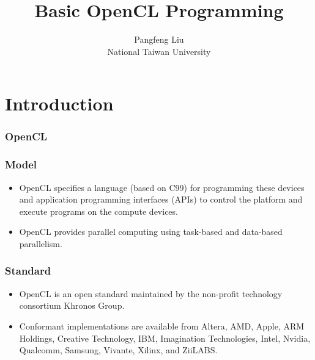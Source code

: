 \documentclass{beamer}
\begin{document}
\title{Basic OpenCL Programming}

\author{Pangfeng Liu \\ National Taiwan University}

\begin{frame}
  \titlepage
\end{frame}

\section{Introduction}

\begin{frame}
  \frametitle{OpenCL} 
\end{frame}

\begin{frame}
  \frametitle{Model} 
  \begin{itemize}
  \item OpenCL specifies a language (based on C99) for programming these
    devices and application programming interfaces (APIs) to control the
    platform and execute programs on the compute devices. 
  \item OpenCL provides parallel computing using task-based and
    data-based parallelism.
  \end{itemize}
\end{frame}

\begin{frame}
  \frametitle{Standard}
  \begin{itemize}
  \item OpenCL is an open standard maintained by the non-profit
    technology consortium Khronos Group.  
  \item Conformant implementations are available from Altera, AMD,
    Apple, ARM Holdings, Creative Technology, IBM, Imagination
    Technologies, Intel, Nvidia, Qualcomm, Samsung, Vivante, Xilinx, and
    ZiiLABS.
  \end{itemize}
\end{frame}
\end{document}
